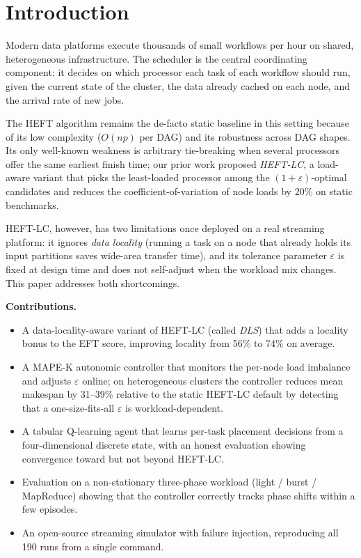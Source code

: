 \documentclass[conference]{IEEEtran}
\begin{document}
\section{Introduction}

Modern data platforms execute thousands of small workflows per hour on shared,
heterogeneous infrastructure. The scheduler is the central coordinating
component: it decides on which processor each task of each workflow should
run, given the current state of the cluster, the data already cached on each
node, and the arrival rate of new jobs.

The HEFT algorithm \cite{topcuoglu2002} remains the de-facto static baseline
in this setting because of its low complexity (\(O(np)\) per DAG) and its
robustness across DAG shapes. Its only well-known weakness is arbitrary
tie-breaking when several processors offer the same earliest finish time; our
prior work proposed \emph{HEFT-LC}, a load-aware variant that picks the
least-loaded processor among the \((1+\varepsilon)\)-optimal candidates and
reduces the coefficient-of-variation of node loads by 20\% on static
benchmarks.

HEFT-LC, however, has two limitations once deployed on a real streaming
platform: it ignores \emph{data locality} (running a task on a node that
already holds its input partitions saves wide-area transfer time), and its
tolerance parameter \(\varepsilon\) is fixed at design time and does not
self-adjust when the workload mix changes. This paper addresses both
shortcomings.

\textbf{Contributions.}
\begin{itemize}
  \item A data-locality-aware variant of HEFT-LC (called \emph{DLS}) that
        adds a locality bonus to the EFT score, improving locality from
        56\% to 74\% on average.
  \item A MAPE-K autonomic controller \cite{kephart2003vision} that monitors
        the per-node load imbalance and adjusts \(\varepsilon\) online; on
        heterogeneous clusters the controller reduces mean makespan by
        31--39\% relative to the static HEFT-LC default by detecting that
        a one-size-fits-all \(\varepsilon\) is workload-dependent.
  \item A tabular Q-learning agent that learns per-task placement decisions
        from a four-dimensional discrete state, with an honest evaluation
        showing convergence toward but not beyond HEFT-LC.
  \item Evaluation on a non-stationary three-phase workload (light /
        burst / MapReduce) showing that the controller correctly tracks
        phase shifts within a few episodes.
  \item An open-source streaming simulator with failure injection,
        reproducing all 190 runs from a single command.
\end{itemize}
\end{document}

